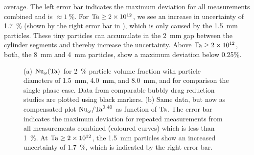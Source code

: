 average.  The left error bar indicates the maximum deviation for all
measurements combined and is $\approx \SI{1}{\percent}$.  For $\text{Ta} \geq
\num{2e12}$, we see an increase in uncertainty of \SI{1.7}{\percent} (shown by
the right error bar in ), which is only caused by
the \SI{1.5}{\milli\metre} particles. These tiny particles can accumulate in
the \SI{2}{\milli\metre} gap between the cylinder segments and thereby
increase the uncertainty. Above $\text{Ta} \geq \num{2e12}$, both, the
\SI{8}{\milli\metre} and \SI{4}{\milli\metre} particles, show a maximum
deviation below 0.25\%.\\
%
\begin{figure}
\centering%
%
%
\caption{%
(a) $\text{Nu}_\omega (\text{Ta})$ for \SI{2}{\percent} particle volume fraction with
particle diameters of \SI{1.5}{\milli\metre}, \SI{4.0}{\milli\metre}, and
\SI{8.0}{\milli\metre}, and for comparison the single phase case. Data from
comparable bubbly drag reduction studies are plotted using black markers. (b)
Same data, but now as compensated plot $\text{Nu}_\omega / \text{Ta}^{0.40}$ as function
of $\text{Ta}$.   The error bar indicates the maximum deviation for repeated
measurements from all measurements combined (coloured curves) which is less
than \SI{1}{\percent}. At $\text{Ta} \geq \num{2e12}$, the \SI{1.5}{\milli\metre}
particles show an increased uncertainty of \SI{1.7}{\percent}, which is
indicated by the right error bar.}
\label{fig:dragReductionSize}
\end{figure}
